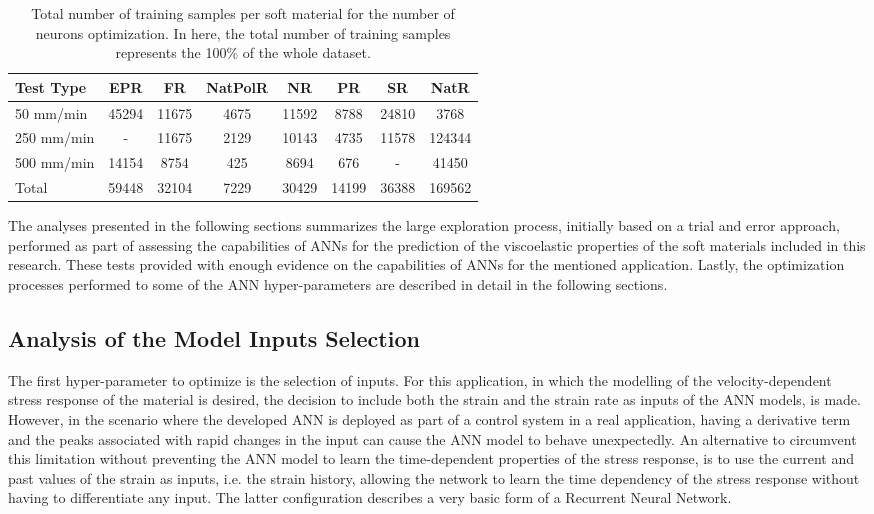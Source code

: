 \begin{table}[htbp!]
	\centering
	\caption{Total number of training samples per soft material for the number of neurons optimization. In here, the total number of training samples represents the 100\% of the whole dataset.}
	\begin{tabular}{lccccccc} \toprule
		Test Type		& EPR	& FR 	& NatPolR 	& NR 	& PR 	& SR 	& NatR \\
		\hline
		50 mm/min		& 45294	& 11675 & 4675 		& 11592 & 8788 	& 24810 &  3768\\
		250 mm/min		& -		& 11675 & 2129 		& 10143 & 4735 	& 11578 &  124344\\
		500 mm/min		& 14154 & 8754 	& 425 		& 8694 	& 676 	& - 	&  41450\\
		\hline
		Total			& 59448 & 32104	& 7229 		& 30429	& 14199	& 36388	&  169562\\
		\bottomrule
	\end{tabular}
	\label{tbl:ANN_nueronOptData}
\end{table}

The analyses presented in the following sections summarizes the large exploration process, initially based on a trial and error approach, performed as part of assessing the capabilities of ANNs for the prediction of the viscoelastic properties of the soft materials included in this research. These tests provided with enough evidence on the capabilities of ANNs for the mentioned application. Lastly, the optimization processes performed to some of the ANN hyper-parameters are described in detail in the following sections.

\subsection{Analysis of the Model Inputs Selection}

The first hyper-parameter to optimize is the selection of inputs. For this application, in which the modelling of the velocity-dependent stress response of the material is desired, the decision to include both the strain and the strain rate as inputs of the ANN models, is made. However, in the scenario where the developed ANN is deployed as part of a control system in a real application, having a derivative term and the peaks associated with rapid changes in the input can cause the ANN model to behave unexpectedly. An alternative to circumvent this limitation without preventing the ANN model to learn the time-dependent properties of the stress response, is to use the current and past values of the strain as inputs, i.e. the strain history, allowing the network to learn the time dependency of the stress response without having to differentiate any input. The latter configuration describes a very basic form of a Recurrent Neural Network. 

